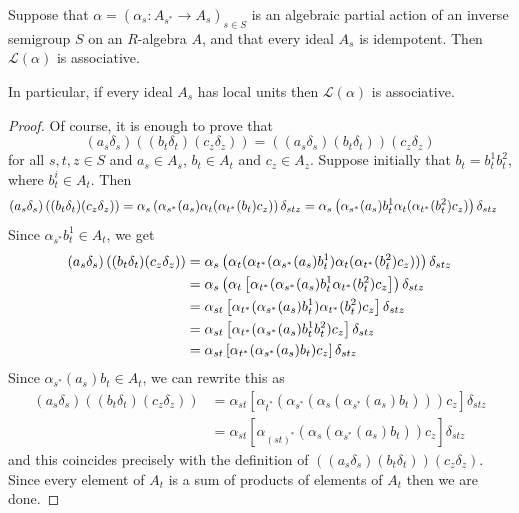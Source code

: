 \begin{proposition}
Suppose that $\alpha=\left(\alpha_s:A_{s^*}\to A_s\right)_{s\in S}$ is an algebraic partial action of an inverse semigroup $S$ on an $R$-algebra $A$, and that every ideal $A_s$ is idempotent. Then $\mathscr{L}(\alpha)$ is associative.

In particular, if every ideal $A_s$ has local units then $\mathscr{L}(\alpha)$ is associative.
\end{proposition}
\begin{proof}
Of course, it is enough to prove that
\[(a_s\delta_s)\left((b_t\delta_t)(c_z\delta_z)\right)=\left((a_s\delta_s)(b_t\delta_t)\right)(c_z\delta_z)\]
for all $s,t,z\in S$ and $a_s\in A_s$, $b_t\in A_t$ and $c_z\in A_z$. Suppose initially that $b_t=b_t^1b_t^2$, where $b_t^i\in A_t$. Then
\begin{align*}
(a_s\delta_s)\left((b_t\delta_t)(c_z\delta_z)\right)\hspace{-3cm}&\hspace{3cm}=\alpha_s\left(\alpha_{s^*}(a_s)\alpha_t(\alpha_{t^*}(b_t)c_z)\right)\delta_{stz}=\alpha_s\left(\alpha_{s^*}(a_s)b_t^1\alpha_t(\alpha_{t^*}(b_t^2)c_z)\right)\delta_{stz}
\end{align*}
Since $\alpha_{s^*}b_t^1\in A_t$, we get
\begin{align*}
(a_s\delta_s)\left((b_t\delta_t)(c_z\delta_z)\right)\hspace{-0cm}&\hspace{0cm}=\alpha_s\left(\alpha_t(\alpha_{t^*}(\alpha_{s^*}(a_s)b_t^1)\alpha_t(\alpha_{t^*}(b_t^2)c_z))\right)\delta_{stz}\\
&=\alpha_s\left(\alpha_t\left[\alpha_{t^*}(\alpha_{s^*}(a_s)b_t^1\alpha_{t^*}(b_t^2)c_z\right]\right)\delta_{stz}\\
&=\alpha_{st}\left[\alpha_{t^*}(\alpha_{s^*}(a_s)b_t^1)\alpha_{t^*}(b_t^2)c_z\right]\delta_{stz}\\
&=\alpha_{st}\left[\alpha_{t^*}(\alpha_{s^*}(a_s)b_t^1b_t^2)c_z\right]\delta_{stz}\\
&=\alpha_{st}\left[\alpha_{t^*}(\alpha_{s^*}(a_s)b_t)c_z\right]\delta_{stz}
\end{align*}
Since $\alpha_{s^*}(a_s)b_t\in A_t$, we can rewrite this as
\begin{align*}
(a_s\delta_s)\left((b_t\delta_t)(c_z\delta_z)\right)&=\alpha_{st}\left[\alpha_{t^*}(\alpha_{s^*}(\alpha_s(\alpha_{s^*}(a_s)b_t)))c_z\right]\delta_{stz}\\
&=\alpha_{st}\left[\alpha_{(st)^*}(\alpha_s(\alpha_{s^*}(a_s)b_t))c_z\right]\delta_{stz}
\end{align*}
and this coincides precisely with the definition of $\left((a_s\delta_s)(b_t\delta_t)\right)(c_z\delta_z)$. Since every element of $A_t$ is a sum of products of elements of $A_t$ then we are done.\qedhere
\end{proof}

